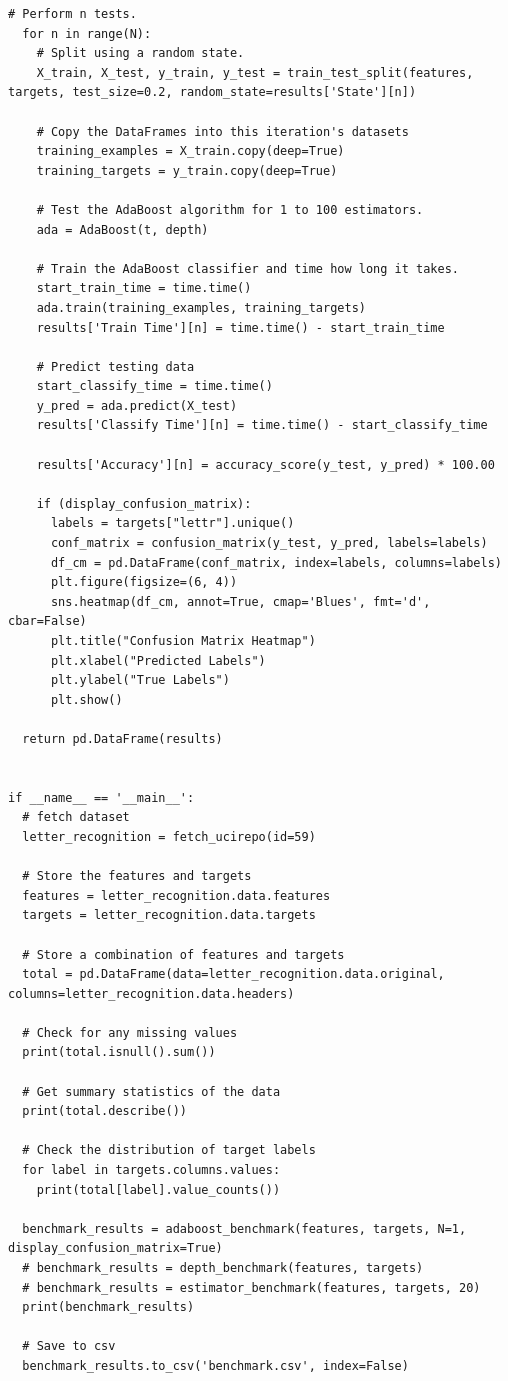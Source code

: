 \documentclass[a4paper]{article}
\begin{document}
\begin{lstlisting}[basicstyle= \scriptsize]
  # Perform n tests.
  for n in range(N):
    # Split using a random state.
    X_train, X_test, y_train, y_test = train_test_split(features, targets, test_size=0.2, random_state=results['State'][n])

    # Copy the DataFrames into this iteration's datasets
    training_examples = X_train.copy(deep=True)
    training_targets = y_train.copy(deep=True)

    # Test the AdaBoost algorithm for 1 to 100 estimators.
    ada = AdaBoost(t, depth) 

    # Train the AdaBoost classifier and time how long it takes.
    start_train_time = time.time()
    ada.train(training_examples, training_targets)
    results['Train Time'][n] = time.time() - start_train_time 

    # Predict testing data
    start_classify_time = time.time()
    y_pred = ada.predict(X_test)
    results['Classify Time'][n] = time.time() - start_classify_time

    results['Accuracy'][n] = accuracy_score(y_test, y_pred) * 100.00

    if (display_confusion_matrix):
      labels = targets["lettr"].unique()
      conf_matrix = confusion_matrix(y_test, y_pred, labels=labels)
      df_cm = pd.DataFrame(conf_matrix, index=labels, columns=labels)
      plt.figure(figsize=(6, 4))
      sns.heatmap(df_cm, annot=True, cmap='Blues', fmt='d', cbar=False)
      plt.title("Confusion Matrix Heatmap")
      plt.xlabel("Predicted Labels")
      plt.ylabel("True Labels")
      plt.show()

  return pd.DataFrame(results)


if __name__ == '__main__':
  # fetch dataset 
  letter_recognition = fetch_ucirepo(id=59) 

  # Store the features and targets
  features = letter_recognition.data.features
  targets = letter_recognition.data.targets

  # Store a combination of features and targets
  total = pd.DataFrame(data=letter_recognition.data.original, columns=letter_recognition.data.headers)

  # Check for any missing values
  print(total.isnull().sum())

  # Get summary statistics of the data
  print(total.describe())

  # Check the distribution of target labels
  for label in targets.columns.values:
    print(total[label].value_counts())

  benchmark_results = adaboost_benchmark(features, targets, N=1, display_confusion_matrix=True)
  # benchmark_results = depth_benchmark(features, targets)
  # benchmark_results = estimator_benchmark(features, targets, 20)
  print(benchmark_results)

  # Save to csv
  benchmark_results.to_csv('benchmark.csv', index=False)
\end{lstlisting}
\end{document}
